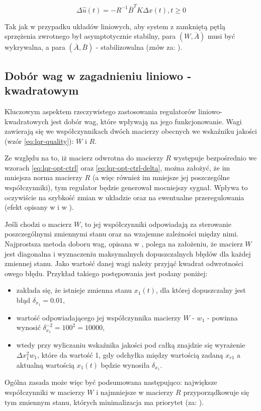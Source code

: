 \begin{equation}\label{eq:lqr-opt-ctrl-delta}
\Delta \hat{u}(t) = -R^{-1}\bar{B}^{T}K\Delta x(t), t \geq 0
\end{equation}

Tak jak w przypadku układów liniowych, aby system z zamkniętą pętlą sprzężenia zwrotnego był asymptotycznie stabilny, para $(W, \bar{A})$ musi być wykrywalna, a para $(\bar{A}, \bar{B})$ - stabilizowalna (znów za: \cite{Korytowski2015}).


\subsection{Dobór wag w zagadnieniu liniowo - kwadratowym}
\label{sub:lqr-weights}

Kluczowym aspektem rzeczywistego zastosowania regulatorów liniowo-kwadratowych jest dobór wag, które wpływają na jego funkcjonowanie. Wagi zawierają się we współczynnikach dwóch macierzy obecnych we wskaźniku jakości (wzór \ref{eq:lqr-quality}): $W$ i $R$.

Ze względu na to, iż macierz odwrotna do macierzy $R$ występuje bezpośrednio we wzorach \ref{eq:lqr-opt-ctrl} oraz \ref{eq:lqr-opt-ctrl-delta}, można założyć, że im mniejsza norma macierzy $R$ (a więc również im mniejsze jej poszczególne współczynniki), tym regulator będzie generował mocniejszy sygnał. Wpływa to oczywiście na szybkość zmian w układzie oraz na ewentualne przeregulowania (efekt opisany w \cite{Mitk2007} i w \cite{Korytowski2015}).

Jeśli chodzi o macierz $W$, to jej współczynniki odpowiadają za sterowanie poszczególnymi zmiennymi stanu oraz na wzajemne zależności między nimi. Najprostsza metoda doboru wag, opisana w \cite{Murray2006}, polega na założeniu, że macierz $W$ jest diagonalna i wyznaczeniu maksymalnych dopuszczalnych błędów dla każdej zmiennej stanu. Jako wartość danej wagi należy przyjąć kwadrat odwrotności owego błędu. Przykład takiego postępowania jest podany poniżej:
\begin{itemize}
    \item zakłada się, że istnieje zmienna stanu $x_{1}(t)$, dla której dopuszczalny jest błąd $\delta_{x_{1}} = 0.01$,
    \item wartość odpowiadającego jej współczynnika macierzy $W$ - $w_{1}$ - powinna wynosić $\delta_{x_{1}}^{-2} = 100^{2} = 10000$,
    \item wtedy przy wyliczaniu wskaźnika jakości pod całką znajdzie się wyrażenie $\Delta x_{1}^{2} w_{1}$, które da wartość 1, gdy odchyłka między wartością zadaną $x_{r1}$ a aktualną wartością $x_{1}(t)$ będzie wynosiła $\delta_{x_{1}}$.
\end{itemize}

Ogólna zasada może więc być podsumowana następująco: największe współczynniki w macierzy $W$ i najmniejsze w macierzy $R$ przyporządkowuje się tym zmiennym stanu, których minimalizacja ma priorytet (za: \cite{Mitk2007}).